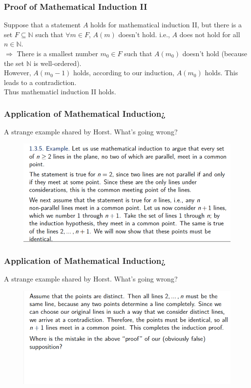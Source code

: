 \documentclass{beamer}
\newcommand{\myfont}{\rmfamily\normalsize\upshape\mdseries}
\begin{document}
\myfont
\begin{frame}
    \frametitle{Proof of Mathematical Induction II}
    \hspace*{1em}
    Suppose that a statement $A$ holds for mathematical induction II, but there is 
    a set $F \subseteq\mathbb{N}$ such that $\forall m \in F$, $A(m)$ doesn't hold.
    i.e., $A$ does not hold for all $n \in \mathbb{N}$. \\
    $\Rightarrow$ There is a smallest number $m_0 \in F$ such that $A(m_0)$ doesn't hold
    (because the set $\mathbb{N}$ is well-ordered).\\
    \hspace{1em} However, $A(m_0-1)$ holds, according to our induction, $A(m_0)$ holds.
    This leads to a contradiction.\\
    \hspace{1em} Thus mathematicl induction II holds.
\end{frame}
\begin{frame}
    \frametitle{Application of Mathematical Induction¿}
    \hspace{1em}
    A strange example shared by Horst. What's going wrong?
    \begin{figure}
        \centering
        \includegraphics[width=1\textwidth]{induction1.png}
    \end{figure}
   
\end{frame}
\begin{frame}
    \frametitle{Application of Mathematical Induction¿}
    \hspace{1em}
    A strange example shared by Horst. What's going wrong?
    \begin{figure}
        \centering
        \includegraphics[width=1\textwidth]{induction2.png}
    \end{figure}
   
\end{frame}
\end{document}
